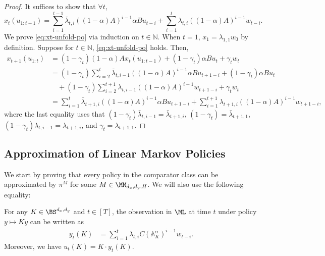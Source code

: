 \begin{proof}
It suffices to show that $\forall t$,
\begin{equation} x_t(u_{1:t-1}) = \sum_{i=1}^{t-1} \bar\lambda_{t,i}((1-\alpha)A)^{i-1}\alpha Bu_{t-i} + \sum_{i=1}^t \lambda_{t,i}((1-\alpha)A)^{i-1} w_{t-i}.\label{eq:xt-unfold-po}\end{equation}
We prove \cref{eq:xt-unfold-po} via induction on $t\in\mathbb{N}$. When $t=1$, $x_1=\lambda_{1,1}w_0$ by definition. Suppose for $t\in\mathbb{N}$, \cref{eq:xt-unfold-po} holds. Then,
\begin{align*}
x_{t+1}(u_{1:t})&=(1-\gamma_t)(1-\alpha)Ax_{t}(u_{1:t-1})+(1-\gamma_ t)\alpha Bu_t+\gamma_tw_t\\
&=(1-\gamma_t)\sum_{i=2}^{t}\bar{\lambda}_{t,i-1}((1-\alpha)A)^{i-1}\alpha Bu_{t+1-i}+(1-\gamma_t)\alpha Bu_t\\
& \quad +(1-\gamma_t)\sum_{i=2}^{t+1}\lambda_{t,i-1}((1-\alpha)A)^{i-1}w_{t+1-i}+\gamma_tw_t\\
&=\sum_{i=1}^{t}\bar{\lambda}_{t+1,i}((1-\alpha)A)^{i-1}\alpha Bu_{t+1-i}+\sum_{i=1}^{t+1}\lambda_{t+1,i}((1-\alpha)A)^{i-1}w_{t+1-i},
\end{align*}
where the last equality uses that $(1-\gamma_t)\bar{\lambda}_{t,i-1}=\bar{\lambda}_{t+1,i}$, $(1-\gamma_t)=\bar{\lambda}_{t+1,1}$, $(1-\gamma_t)\lambda_{t,i-1}=\lambda_{t+1,i}$, and $\gamma_t=\lambda_{t+1,1}$. 
\end{proof}

\subsection{Approximation of Linear Markov Policies}
\label{sec:approx-po}
We start by proving that every policy in the comparator class can be approximated by $\pi^M$ for some $M \in \MM_{d_x,d_y,H}$.  
We will also use the following equality:


\begin{observation}
\label{fact:linear-unfold}
For any $K \in \BS^{d_x,d_y}$ and $t \in [T]$, the observation in $\ML$ at time $t$ under policy $y \mapsto Ky$ can be written as
\begin{align}
\label{eq:K0-signal-unfold}
y_t(K)&=\sum_{i=1}^{t}\lambda_{t,i}C(\mathbb{A}_{K}^{\alpha})^{i-1}w_{t-i}.
\end{align}
Moreover, we have $u_t(K) = K \cdot y_t(K)$. 
\end{observation}

